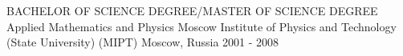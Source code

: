 
\begin{cventries}

  \cvblitz
    {BACHELOR OF SCIENCE DEGREE/MASTER OF SCIENCE DEGREE} %
    {Applied Mathematics and Physics}
    {Moscow Institute of Physics and Technology (State University) (MIPT)} %
    {Moscow, Russia} %
    {2001 - 2008} %

\end{cventries}
